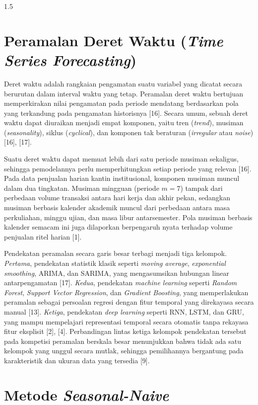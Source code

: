 \documentclass[12pt, a4paper, onecolumn, oneside]{report}
\begin{document}
\begin{spacing}{1.5}
\section{Peramalan Deret Waktu (\textit{Time Series Forecasting})}

Deret waktu adalah rangkaian pengamatan suatu variabel yang dicatat secara berurutan dalam interval waktu yang tetap. Peramalan deret waktu bertujuan memperkirakan nilai pengamatan pada periode mendatang berdasarkan pola yang terkandung pada pengamatan historisnya [16]. Secara umum, sebuah deret waktu dapat diuraikan menjadi empat komponen, yaitu tren (\textit{trend}), musiman (\textit{seasonality}), siklus (\textit{cyclical}), dan komponen tak beraturan (\textit{irregular} atau \textit{noise}) [16], [17].

Suatu deret waktu dapat memuat lebih dari satu periode musiman sekaligus, sehingga pemodelannya perlu memperhitungkan setiap periode yang relevan [16]. Pada data penjualan harian kantin institusional, komponen musiman muncul dalam dua tingkatan. Musiman mingguan (periode $m = 7$) tampak dari perbedaan volume transaksi antara hari kerja dan akhir pekan, sedangkan musiman berbasis kalender akademik muncul dari perbedaan antara masa perkuliahan, minggu ujian, dan masa libur antarsemester. Pola musiman berbasis kalender semacam ini juga dilaporkan berpengaruh nyata terhadap volume penjualan ritel harian [1].

Pendekatan peramalan secara garis besar terbagi menjadi tiga kelompok. \textit{Pertama}, pendekatan statistik klasik seperti \textit{moving average}, \textit{exponential smoothing}, ARIMA, dan SARIMA, yang mengasumsikan hubungan linear antarpengamatan [17]. \textit{Kedua}, pendekatan \textit{machine learning} seperti \textit{Random Forest}, \textit{Support Vector Regression}, dan \textit{Gradient Boosting}, yang memperlakukan peramalan sebagai persoalan regresi dengan fitur temporal yang direkayasa secara manual [13]. \textit{Ketiga}, pendekatan \textit{deep learning} seperti RNN, LSTM, dan GRU, yang mampu mempelajari representasi temporal secara otomatis tanpa rekayasa fitur eksplisit [2], [4]. Perbandingan lintas ketiga kelompok pendekatan tersebut pada kompetisi peramalan berskala besar menunjukkan bahwa tidak ada satu kelompok yang unggul secara mutlak, sehingga pemilihannya bergantung pada karakteristik dan ukuran data yang tersedia [9].

\section{Metode \textit{Seasonal-Naive}}


\end{spacing}
\end{document}

